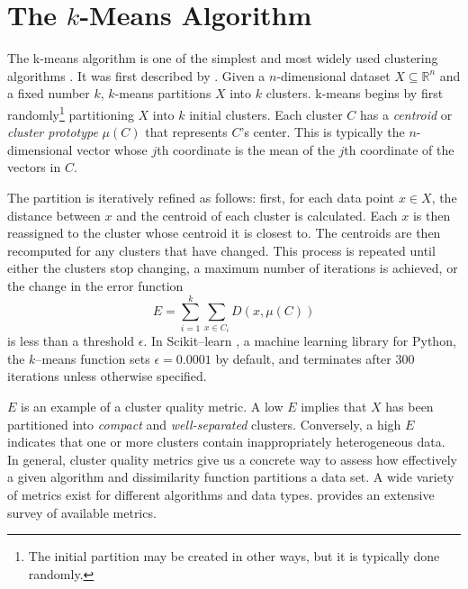 \section{The $k$-Means Algorithm}
The k-means algorithm is one of the simplest and most widely used clustering algorithms \citep{gan2007}. It was first described by \citet{macqueen67}. Given a $n$-dimensional dataset $X \subseteq \mathbb{R}^n$ and a fixed number $k$, $k$-means  partitions $X$ into $k$ clusters. k-means begins by first randomly\footnote{The initial partition may be created in other ways, but it is typically done randomly.} partitioning $X$ into $k$ initial clusters. Each cluster $C$ has a \textit{centroid} or \textit{cluster prototype} $\mu(C)$ that represents $C$'s center. This is typically the $n$-dimensional vector whose $j$th coordinate is the mean of the $j$th coordinate of the vectors in $C$.

The partition is iteratively refined as follows: first, for each data point $x \in X$, the distance between $x$ and the centroid of each cluster is calculated. Each $x$ is then reassigned to the cluster whose centroid it is closest to. The centroids are then recomputed for any clusters that have changed. This process is repeated until either the clusters stop changing, a maximum number of iterations is achieved, or the change in the error function
\[ E = \sum_{i=1}^k \sum_{x \in C_i} D(x, \mu(C)) \]
is less than a threshold $\epsilon$\citep{gan2007}. In Scikit--learn \citep{scikit-learn}, a machine learning library for Python, the $k$--means function sets $\epsilon=0.0001$ by default, and terminates after 300 iterations unless otherwise specified.

$E$ is an example of a cluster quality metric. A low $E$ implies that $X$ has been partitioned into \textit{compact} and \textit{well-separated} clusters. Conversely, a high $E$ indicates that one or more clusters contain inappropriately heterogeneous data. In general, cluster quality metrics give us a concrete way to assess how effectively a given algorithm and dissimilarity function partitions a data set. A wide variety of metrics exist for different algorithms and data types. \citet{gan2007} provides an extensive survey of available metrics.

